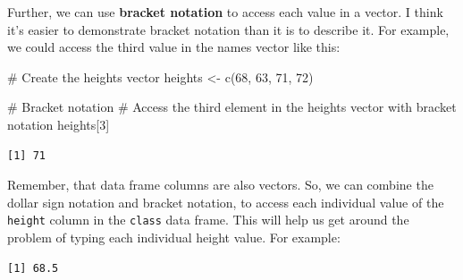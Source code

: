 \documentclass[
  letterpaper,
  DIV=11,
  numbers=noendperiod]{scrreprt}
\newenvironment{Shaded}{\begin{snugshade}}{\end{snugshade}}
\newcommand{\CommentTok}[1]{\textcolor[rgb]{0.37,0.37,0.37}{#1}}
\newcommand{\DecValTok}[1]{\textcolor[rgb]{0.68,0.00,0.00}{#1}}
\newcommand{\FunctionTok}[1]{\textcolor[rgb]{0.28,0.35,0.67}{#1}}
\newcommand{\NormalTok}[1]{\textcolor[rgb]{0.00,0.23,0.31}{#1}}
\newcommand{\OtherTok}[1]{\textcolor[rgb]{0.00,0.23,0.31}{#1}}
\newcommand{\SpecialCharTok}[1]{\textcolor[rgb]{0.37,0.37,0.37}{#1}}
\begin{document}
Further, we can use \textbf{bracket notation} to access each value in a
vector. I think it's easier to demonstrate bracket notation than it is
to describe it. For example, we could access the third value in the
names vector like this:

\begin{Shaded}
\begin{Highlighting}[]
\CommentTok{\# Create the heights vector}
\NormalTok{heights }\OtherTok{\textless{}{-}} \FunctionTok{c}\NormalTok{(}\DecValTok{68}\NormalTok{, }\DecValTok{63}\NormalTok{, }\DecValTok{71}\NormalTok{, }\DecValTok{72}\NormalTok{)}

\CommentTok{\# Bracket notation}
\CommentTok{\# Access the third element in the heights vector with bracket notation}
\NormalTok{heights[}\DecValTok{3}\NormalTok{]}
\end{Highlighting}
\end{Shaded}

\begin{verbatim}
[1] 71
\end{verbatim}

Remember, that data frame columns are also vectors. So, we can combine
the dollar sign notation and bracket notation, to access each individual
value of the \texttt{height} column in the \texttt{class} data frame.
This will help us get around the problem of typing each individual
height value. For example:

\begin{Shaded}
\end{Shaded}

\begin{verbatim}
[1] 68.5
\end{verbatim}
\end{document}
